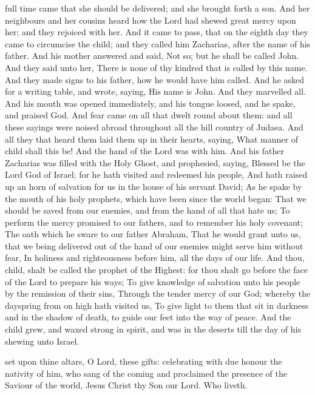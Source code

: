  full time came that she should be delivered; and she brought forth a son. And her neighbours and her cousins heard how the Lord had shewed great mercy upon her; and they rejoiced with her. And it came to pass, that on the eighth day they came to circumcise the child; and they called him Zacharias, after the name of his father. And his mother answered and said, Not so; but he shall be called John. And they said unto her, There is none of thy kindred that is called by this name. And they made signs to his father, how he would have him called. And he asked for a writing table, and wrote, saying, His name is John. And they marvelled all. And his mouth was opened immediately, and his tongue loosed, and he spake, and praised God. And fear came on all that dwelt round about them: and all these sayings were noised abroad throughout all the hill country of Judaea. And all they that heard them laid them up in their hearts, saying, What manner of child shall this be! And the hand of the Lord was with him. And his father Zacharias was filled with the Holy Ghost, and prophesied, saying, Blessed be the Lord God of Israel; for he hath visited and redeemed his people, And hath raised up an horn of salvation for us in the house of his servant David; As he spake by the mouth of his holy prophets, which have been since the world began: That we should be saved from our enemies, and from the hand of all that hate us; To perform the mercy promised to our fathers, and to remember his holy covenant; The oath which he sware to our father Abraham, That he would grant unto us, that we being delivered out of the hand of our enemies might serve him without fear, In holiness and righteousness before him, all the days of our life. And thou, child, shalt be called the prophet of the Highest: for thou shalt go before the face of the Lord to prepare his ways; To give knowledge of salvation unto his people by the remission of their sins, Through the tender mercy of our God; whereby the dayspring from on high hath visited us, To give light to them that sit in darkness and in the shadow of death, to guide our feet into the way of peace. And the child grew, and waxed strong in spirit, and was in the deserts till the day of his shewing unto Israel.

\clearpage
{}

\secret\label{JohnBaptistSecret}
 set upon thine altars, O Lord, these gifts: celebrating with due honour the nativity of him, who sang of the coming and proclaimed the presence of the Saviour of the world, Jesus Christ thy Son our Lord. Who liveth.

